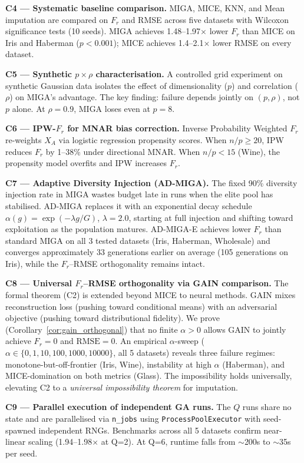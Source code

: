 \textbf{C4 --- Systematic baseline comparison.} MIGA, MICE, KNN, and Mean imputation are compared on $F_r$ and RMSE across five datasets with Wilcoxon significance tests (10 seeds). MIGA achieves 1.48--1.97$\times$ lower $F_r$ than MICE on Iris and Haberman ($p < 0.001$); MICE achieves 1.4--2.1$\times$ lower RMSE on every dataset.

\textbf{C5 --- Synthetic $p \times \rho$ characterisation.} A controlled grid experiment on synthetic Gaussian data isolates the effect of dimensionality ($p$) and correlation ($\rho$) on MIGA's advantage. The key finding: failure depends jointly on $(p, \rho)$, not $p$ alone. At $\rho = 0.9$, MIGA loses even at $p = 8$.

\textbf{C6 --- IPW-$F_r$ for MNAR bias correction.} Inverse Probability Weighted $F_r$ re-weights $X_A$ via logistic regression propensity scores. When $n/p \geq 20$, IPW reduces $F_r$ by 1--38\% under directional MNAR. When $n/p < 15$ (Wine), the propensity model overfits and IPW increases $F_r$.

\textbf{C7 --- Adaptive Diversity Injection (AD-MIGA).} The fixed 90\% diversity injection rate in MIGA wastes budget late in runs when the elite pool has stabilised. AD-MIGA replaces it with an exponential decay schedule $\alpha(g) = \exp(-\lambda g/G)$, $\lambda=2.0$, starting at full injection and shifting toward exploitation as the population matures. AD-MIGA-E achieves lower $F_r$ than standard MIGA on all 3 tested datasets (Iris, Haberman, Wholesale) and converges approximately 33 generations earlier on average (105 generations on Iris), while the $F_r$--RMSE orthogonality remains intact.

\textbf{C8 --- Universal $F_r$--RMSE orthogonality via GAIN comparison.} The formal theorem (C2) is extended beyond MICE to neural methods. GAIN \cite{Yoon2018} mixes reconstruction loss (pushing toward conditional means) with an adversarial objective (pushing toward distributional fidelity). We prove (Corollary~\ref{cor:gain_orthogonal}) that no finite $\alpha > 0$ allows GAIN to jointly achieve $F_r = 0$ and $\mathrm{RMSE} = 0$. An empirical $\alpha$-sweep ($\alpha \in \{0,1,10,100,1000,10000\}$, all 5 datasets) reveals three failure regimes: monotone-but-off-frontier (Iris, Wine), instability at high $\alpha$ (Haberman), and MICE-domination on both metrics (Glass). The impossibility holds universally, elevating C2 to a \emph{universal impossibility theorem} for imputation.

\textbf{C9 --- Parallel execution of independent GA runs.} The $Q$ runs share no state and are parallelised via \texttt{n\_jobs} using \texttt{ProcessPoolExecutor} with seed-spawned independent RNGs. Benchmarks across all 5 datasets confirm near-linear scaling (1.94--1.98$\times$ at Q=2). At Q=6, runtime falls from $\sim$200s to $\sim$35s per seed.

